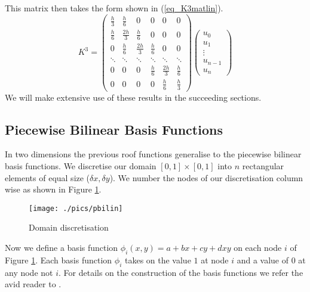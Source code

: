 \documentclass[11pt,fleqn]{article}
\theoremstyle{defstyle}
\begin{document}
This matrix then takes the form shown in (\ref{eq_K3matlin}).
\begin{equation}
K^3 = \begin{pmatrix}
\frac{h}{3} & \frac{h}{6} &0& 0 & 0 &  0\\
\frac{h}{6} & \frac{2h}{3} & \frac{h}{6} & 0 & 0 &  0\\
0 & \frac{h}{6} & \frac{2h}{3} & \frac{h}{6} & 0 & 0  \\
\ddots & \ddots & \ddots & \ddots & \ddots & \ddots \\
0 & 0 & 0  & \frac{h}{6}& \frac{2h}{3} & \frac{h}{6} \\
0 & 0 & 0 & 0 &\frac{h}{6} & \frac{h}{3}   
\end{pmatrix}
\begin{pmatrix}
u_0 \\ u_1 \\ \vdots \\ u_{n-1} \\ u_n
\end{pmatrix}
\label{eq_K3matlin}
\end{equation} 
We will make extensive use of these results in the succeeding sections.

\subsection{Piecewise Bilinear Basis Functions}
\label{section_pbbf}
In two dimensions the previous roof functions generalise to the piecewise bilinear basis functions. We discretise our domain $[0,1] \times [0,1]$ into $n$ rectangular elements of equal size ($\delta x, \delta y$). We number the nodes of our discretisation column wise as shown in Figure \ref{fig_pbilindomain}.
\begin{figure}[H] 
\centering
\texttt{[image: ./pics/pbilin]}
\caption{Domain discretisation} 
\label{fig_pbilindomain}
\end{figure}
Now we define a basis function $\phi_i(x,y) = a+ bx +cy +dxy$ on each node $i$ of Figure \ref{fig_pbilindomain}. Each basis function $\phi_i$ takes on the value $1$ at node $i$ and a value of $0$ at any node not $i$. For details on the construction of the basis functions we refer the avid reader to \cite{vrb}. 
\end{document}
